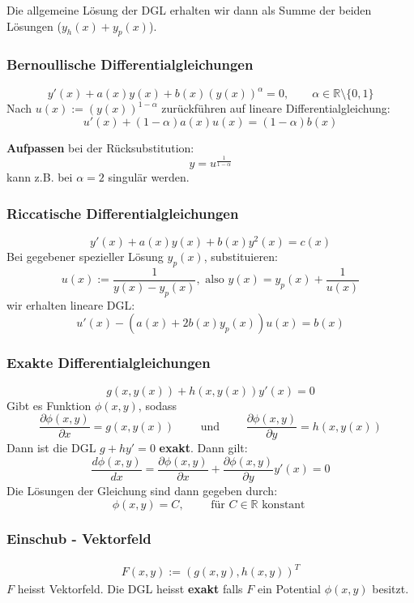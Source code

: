 \documentclass[a4paper]{article}
\newcommand{\R}{\mathbb{R}}
\begin{document}
Die allgemeine Lösung der DGL erhalten wir dann als Summe der beiden
Lösungen ($y_h(x) + y_p(x)$).

\subsubsection{Bernoullische Differentialgleichungen}
\[
	y' (x) + a(x) y(x) + b(x) (y(x)) ^{\alpha} = 0,
	\qquad \alpha \in \R \setminus \{
		0, 1
	\} 
\] 
Nach $u(x) := (y(x)) ^{1 - \alpha}$ zurückführen auf lineare
Differentialgleichung:
\[
	u'(x) + (1 - \alpha) a(x) u(x) = (1 - \alpha) b(x)
\] 

\textbf{Aufpassen} bei der Rücksubstitution:
\[
y = u ^{\frac{ 1 }{ 1- \alpha }}
\] 
kann z.B. bei $\alpha = 2$ singulär werden.

\subsubsection{Riccatische Differentialgleichungen}
\[
	y' (x) + a(x) y(x) + b(x) y ^2 (x) = c(x)
\] 
Bei gegebener spezieller Lösung $y_p (x)$, substituieren:
\[
	u(x) := \frac{ 1 }{ y(x) - y_p (x) }, \text{ also }
	y(x) = y_p (x) + \frac{ 1 }{ u(x) }
\] 
wir erhalten lineare DGL:
\[
	u' (x) - \left(
		a(x) + 2b (x) y_p (x)
	\right) u(x) = b(x)
\] 

\subsubsection{Exakte Differentialgleichungen}
\[
	g(x, y(x)) + h(x, y(x)) y' (x) = 0
\] 
Gibt es Funktion $\phi(x, y)$, sodass
\[
	\frac{ \partial \phi (x,y) }{ \partial x } = 
	g(x, y(x))
	\qquad
	\text{ und }
	\qquad
	\frac{ \partial \phi (x,y) }{ \partial y } = 
	h(x, y(x))
\] 
Dann ist die DGL $g + hy' = 0$ \textbf{exakt}.
Dann gilt:
\[
	\frac{ d \phi (x, y) }{ dx }
	= 
	\frac{ \partial \phi (x,y) }{ \partial x }
	+
	\frac{ \partial \phi (x,y) }{ \partial y } y' (x) = 0
\] 
Die Lösungen der Gleichung sind dann gegeben durch:
\[
	\phi (x, y) = C, \qquad
	\text{ für } C \in \R \text{ konstant }
\] 

\subsubsection{Einschub - Vektorfeld}
\begin{align*}
	F(x, y) := \left(
		g(x, y), h(x, y)
	\right) ^{T}
\end{align*}
$F$ heisst Vektorfeld. Die DGL heisst \textbf{exakt} falls $F$
ein Potential $\phi(x, y)$ besitzt.
\end{document}
